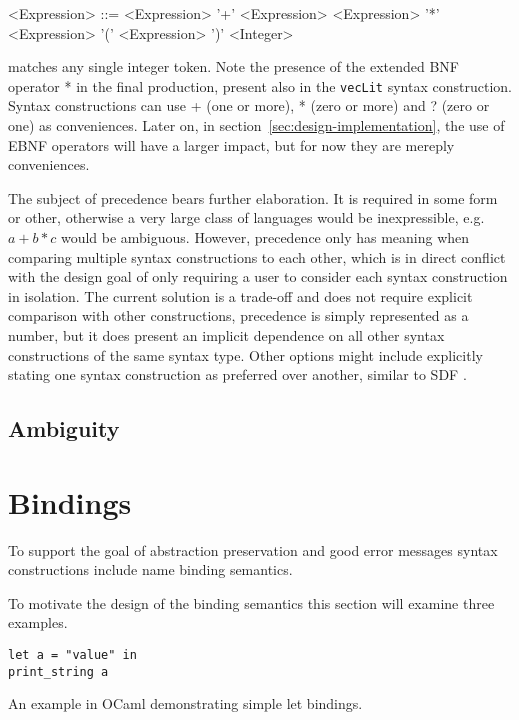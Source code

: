 \documentclass{kththesis}
\begin{document}
\begin{grammar}
<Expression> ::= <Expression> '+' <Expression>
  \alt <Expression> '*' <Expression>
  \alt '(' <Expression> ')'
  \alt <Integer>
\end{grammar}

 matches any single integer token. Note the presence of the extended BNF operator * in the final production, present also in the \texttt{vecLit} syntax construction. Syntax constructions can use + (one or more), * (zero or more) and ? (zero or one) as conveniences. Later on, in section~\ref{sec:design-implementation}, the use of EBNF operators will have a larger impact, but for now they are mereply conveniences.

The subject of precedence bears further elaboration. It is required in some form or other, otherwise a very large class of languages would be inexpressible, e.g. $a + b * c$ would be ambiguous. However, precedence only has meaning when comparing multiple syntax constructions to each other, which is in direct conflict with the design goal of only requiring a user to consider each syntax construction in isolation. The current solution is a trade-off and does not require explicit comparison with other constructions, precedence is simply represented as a number, but it does present an implicit dependence on all other syntax constructions of the same syntax type. Other options might include explicitly stating one syntax construction as preferred over another, similar to SDF \cite{Heering1989The-syntax-defi}.

\subsection{Ambiguity}



\section{Bindings} \label{sec:design-bindings}

To support the goal of abstraction preservation and good error messages syntax constructions include name binding semantics.

To motivate the design of the binding semantics this section will examine three examples.

\begin{listing}
\begin{verbatim}
let a = "value" in
print_string a
\end{verbatim}
\caption{An example in OCaml demonstrating simple let bindings.}
\label{lst:nested-binding-example}
\end{listing}
\end{document}
